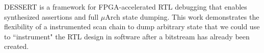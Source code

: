 \documentclass[sigconf]{acmart}
\begin{document}

DESSERT\cite{dessert} is a framework for FPGA-accelerated RTL debugging that enables synthesized assertions and full $\mu$Arch state dumping.
This work demonstrates the flexibility of a instrumented scan chain to dump arbitrary state that we could use to ``instrument" the RTL design in software after a bitstream has already been created.



\end{document}
